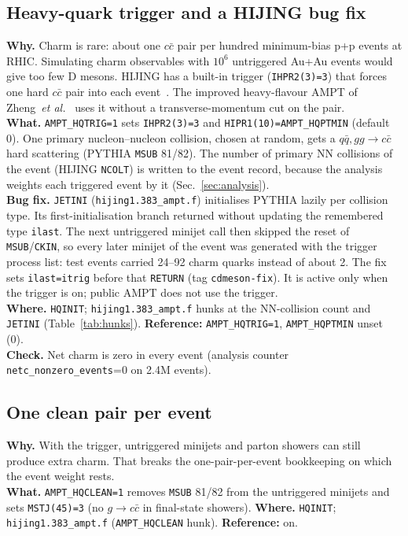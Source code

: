 \documentclass[11pt,a4paper]{article}
\newcommand{\sw}[1]{\texttt{#1}}
\newcommand{\code}[1]{\texttt{#1}}
\begin{document}
\subsection{Heavy-quark trigger and a HIJING bug fix}
\textbf{Why.} Charm is rare: about one $c\bar c$ pair per hundred minimum-bias p+p events at RHIC. Simulating charm
observables with $10^6$ untriggered Au+Au events would give too few D mesons. HIJING has a built-in trigger
(\code{IHPR2(3)=3}) that forces one hard $c\bar c$ pair into each event~\cite{hijing}. The improved heavy-flavour AMPT
of Zheng~\emph{et al.}~\cite{zheng2020} uses it without a transverse-momentum cut on the pair.\\
\textbf{What.} \sw{AMPT\_HQTRIG=1} sets \code{IHPR2(3)=3} and \code{HIPR1(10)=}\sw{AMPT\_HQPTMIN} (default 0). One
primary nucleon--nucleon collision, chosen at random, gets a $q\bar q, gg\to c\bar c$ hard scattering (PYTHIA
\code{MSUB} 81/82). The number of primary NN collisions of the event (HIJING \code{NCOLT}) is written to the event
record, because the analysis weights each triggered event by it (Sec.~\ref{sec:analysis}).\\
\textbf{Bug fix.} \code{JETINI} (\code{hijing1.383\_ampt.f}) initialises PYTHIA lazily per collision type. Its
first-initialisation branch returned without updating the remembered type \code{ilast}. The next untriggered minijet
call then skipped the reset of \code{MSUB}/\code{CKIN}, so every later minijet of the event was generated with the
trigger process list: test events carried 24--92 charm quarks instead of about 2. The fix sets \code{ilast=itrig}
before that \code{RETURN} (tag \code{cdmeson-fix}). It is active only when the trigger is on; public AMPT does not use
the trigger.\\
\textbf{Where.} \code{HQINIT}; \code{hijing1.383\_ampt.f} hunks at the NN-collision count and \code{JETINI}
(Table~\ref{tab:hunks}). \textbf{Reference:} \sw{AMPT\_HQTRIG=1}, \sw{AMPT\_HQPTMIN} unset (0).\\
\textbf{Check.} Net charm is zero in every event (analysis counter \code{netc\_nonzero\_events}=0 on 2.4M events).

\subsection{One clean pair per event}
\textbf{Why.} With the trigger, untriggered minijets and parton showers can still produce extra charm. That breaks the
one-pair-per-event bookkeeping on which the event weight rests.\\
\textbf{What.} \sw{AMPT\_HQCLEAN=1} removes \code{MSUB} 81/82 from the untriggered minijets and sets
\code{MSTJ(45)=3} (no $g\to c\bar c$ in final-state showers).
\textbf{Where.} \code{HQINIT}; \code{hijing1.383\_ampt.f} (\code{AMPT\_HQCLEAN} hunk). \textbf{Reference:} on.
\end{document}
